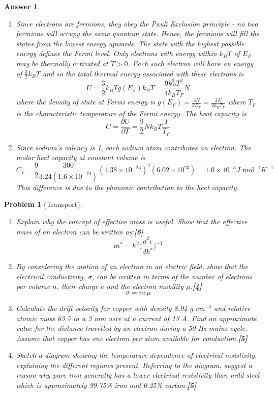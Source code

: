 \documentclass[a4paper]{article}
\newtheorem{ans}{Answer}[subsection]
\theoremstyle{new}
\newtheorem{qns}{Problem}[subsection]
\begin{document}
\begin{ans}
\begin{enumerate}[label=(\alph*)]
\begin{center}
\end{center}
\item Since electrons are fermions, they obey the Pauli Exclusion principle - no two fermions will occupy the same quantum state. Hence, the fermions will fill the states from the lowest energy upwards. The state with the highest possible energy defines the Fermi level. Only electrons with energy within $k_BT$ of $E_F$ may be thermally activated at $T>0$. Each such electron will have an energy of $\frac{3}{2}k_BT$ and so the total thermal energy associated with these electrons is
$$U=\frac{3}{2}k_BTg(E_F)k_BT=\frac{9k_B^2T^2}{4k_BT_F}N$$
where the density of state at Fermi energy is $g(E_F)=\frac{3N}{2E_F}=\frac{3N}{2k_BT_F}$ where $T_F$ is the characteristic temperature of the Fermi energy. The heat capacity is 
$$C=\frac{\partial U}{\partial T}=\frac{9}{2}Nk_BT\frac{T}{T_F}$$
\item Since sodium's valency is 1, each sodium atom contributes an electron. The molar heat capacity at constant volume is
$$C_V=\frac{9}{2}\frac{300}{3.24(1.6\times10^{-19})}(1.38\times10^{-23})^2(6.02\times10^{23})=1.0\times10^{-3}J\text{ mol}^{-1}K^{-1}$$
This difference is due to the phononic contribution to the heat capacity.
\end{enumerate}
\end{ans}
\begin{qns}[Transport]\leavevmode
\begin{enumerate}[label=(\alph*)]
\item Explain why the concept of effective mass is useful. Show that the effective mass of an electron can be written as:\hfill\textbf{[6]}
$$m^*=\hbar^2\bigg(\frac{d^2\epsilon}{dk^2}\bigg)^{-1}$$
\item By considering the motion of an electron in an electric field, show that the electrical conductivity, $\sigma$, can be written in terms of the number of electrons per volume $n$, their charge $e$ and the electron mobility $\mu$:\hfill\textbf{[4]}
$$\sigma=ne\mu$$
\item Calculate the drift velocity for copper with density 8.94 g cm$^{-3}$ and relative atomic mass 63.5 in a 3 mm wire at a current of 13 A. Find an approximate value for the distance travelled by an electron during a 50 Hz mains cycle. Assume that copper has one electron per atom available for conduction.\hfill\textbf{[5]}
\item Sketch a diagram showing the temperature dependence of electrical resistivity, explaining the different regimes present. Referring to the diagram, suggest a reason why pure iron generally has a lower electrical resistivity than mild steel which is approximately 99.75\% iron and 0.25\% carbon.\hfill\textbf{[5]}
\end{enumerate}
\end{qns}
\end{document}
